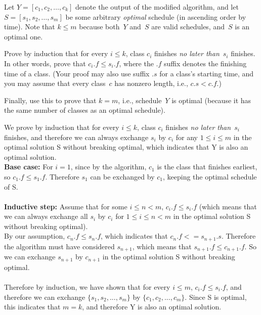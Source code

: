 \documentclass[11pt,addpoints]{exam}
\begin{document}
\begin{questions}
\begin{parts}
    Let $Y = [c_{1}, c_{2}, \ldots, c_{k}]$ denote the output of the modified algorithm, and let $S = [s_{1}, s_{2}, \ldots, s_{m}]$ be some arbitrary \emph{optimal} schedule (in ascending order by time).
    Note that $k \leq m$ because both~$Y$ and~$S$ are valid schedules, and~$S$ is an optimal one.

    Prove by induction that for every $i \leq k$, class $c_{i}$ finishes \emph{no later than}~$s_{i}$ finishes.
    In other words, prove that $c_i.f \leq s_i.f$, where the $.f$ suffix denotes the finishing time of a class.
    (Your proof may also use suffix $.s$ for a class's starting time, and you may assume that every class~$c$ has nonzero length, i.e., $c.s < c.f$.)
    
    Finally, use this to prove that $k=m$, i.e., schedule~$Y$ is optimal (because it has the same number of classes as an optimal schedule).

    \begin{solution}

    We prove by induction that for every $i \leq k$, class $c_{i}$ finishes \emph{no later than}~$s_{i}$ finishes, and therefore we can always exchange $s_i$ by $c_i$ for any $1 \leq i \leq m$ in the optimal solution S without breaking optimal, which indicates that Y is also an optimal solution.\\

    \textbf{Base case:} For $i=1$, since by the algorithm, $c_1$ is the class that finishes earliest, so $c_1.f \leq s_1.f$. Therefore $s_1$ can be exchanged by $c_1$, keeping the optimal schedule of S.\\\\
    \textbf{Inductive step:} Assume that for some $i \leq n < m$, $c_i.f \leq s_i.f$ (which means that we can always exchange all $s_i$ by $c_i$ for $1 \leq i \leq n <m$ in the optimal solution S without breaking optimal).\\
    By our assumption, $c_n.f \leq s_n.f$, which indicates that $c_n.f <= s_{n+1}.s$. Therefore the algorithm must have considered $s_{n+1}$, which means that $s_{n+1}.f \leq c_{n+1}.f$. So we can exchange $s_{n+1}$ by $c_{n+1}$ in the optimal solution S without breaking optimal.\\\\
    Therefore by induction, we have shown that for every $i \leq m$, $c_{i}.f \leq s_{i}.f$, and therefore we can exchange $\{s_1, s_2, ..., s_m\}$ by $\{c_1, c_2, ..., c_m\}$. Since S is optimal, this indicates that $m=k$, and therefore Y is also an optimal solution.
    \end{solution}
  \end{parts}


\end{questions}
\end{document}

